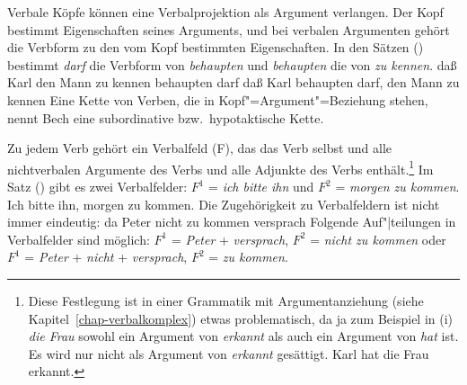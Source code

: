 
Verbale Köpfe können eine Verbalprojektion als Argument verlangen. Der Kopf bestimmt
Eigenschaften seines Arguments, und bei verbalen Argumenten gehört die Verbform zu 
den vom Kopf bestimmten Eigenschaften. In den Sätzen () bestimmt \emph{darf}
die Verbform von \emph{behaupten} und \emph{behaupten} die von \emph{zu kennen}.
\eal
\ex daß Karl den Mann zu kennen behaupten darf
\ex daß Karl behaupten darf, den Mann zu kennen
\zl
Eine Kette von Verben, die in Kopf"=Argument"=Beziehung stehen, nennt Bech eine subordinative
bzw.\ hypotaktische Kette.%
%
%
%
%


%
%
Zu jedem Verb gehört ein Verbalfeld (F), das das Verb selbst und alle nichtverbalen
Argumente des Verbs und alle Adjunkte des Verbs enthält.\footnote{
        Diese Festlegung ist in einer Grammatik mit Argumentanziehung
        (siehe Kapitel~\ref{chap-verbalkomplex}) etwas
        problematisch, da ja zum Beispiel in (i) \emph{die Frau} sowohl ein
        Argument von \emph{erkannt} als auch ein Argument von \emph{hat} ist.
        Es wird nur nicht als Argument von \emph{erkannt} gesättigt.
\ea
Karl hat die Frau erkannt.
\zlast%
}
Im Satz () gibt es zwei Verbalfelder: $F^1$ = \emph{ich bitte ihn} und $F^2$ =
\emph{morgen zu kommen}.
\ea
Ich bitte ihn, morgen zu kommen.
\z
Die Zugehörigkeit zu Verbalfeldern ist nicht immer eindeutig:
\ea
\label{zu_kommen_versprach}
da Peter nicht zu kommen versprach
\z
Folgende Auf"|teilungen in Verbalfelder sind möglich: $F^1$ = \emph{Peter} + \emph{versprach},
$F^2$ = \emph{nicht zu kommen} oder $F^1$ = \emph{Peter} + \emph{nicht} + \emph{versprach}, 
$F^2$ = \emph{zu kommen}.


